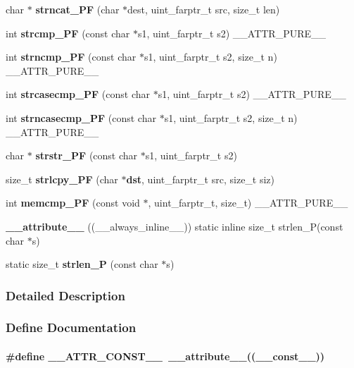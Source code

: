 \begin{DoxyCompactItemize}
\item 
char $\ast$ {\bf strncat\_\-PF} (char $\ast$dest, uint\_\-farptr\_\-t src, size\_\-t len)
\item 
int {\bf strcmp\_\-PF} (const char $\ast$s1, uint\_\-farptr\_\-t s2) \_\-\_\-ATTR\_\-PURE\_\-\_\-
\item 
int {\bf strncmp\_\-PF} (const char $\ast$s1, uint\_\-farptr\_\-t s2, size\_\-t n) \_\-\_\-ATTR\_\-PURE\_\-\_\-
\item 
int {\bf strcasecmp\_\-PF} (const char $\ast$s1, uint\_\-farptr\_\-t s2) \_\-\_\-ATTR\_\-PURE\_\-\_\-
\item 
int {\bf strncasecmp\_\-PF} (const char $\ast$s1, uint\_\-farptr\_\-t s2, size\_\-t n) \_\-\_\-ATTR\_\-PURE\_\-\_\-
\item 
char $\ast$ {\bf strstr\_\-PF} (const char $\ast$s1, uint\_\-farptr\_\-t s2)
\item 
size\_\-t {\bf strlcpy\_\-PF} (char $\ast${\bf dst}, uint\_\-farptr\_\-t src, size\_\-t siz)
\item 
int {\bf memcmp\_\-PF} (const void $\ast$, uint\_\-farptr\_\-t, size\_\-t) \_\-\_\-ATTR\_\-PURE\_\-\_\-
\item 
{\bf \_\-\_\-attribute\_\-\_\-} ((\_\-\_\-always\_\-inline\_\-\_\-)) static inline size\_\-t strlen\_\-P(const char $\ast$s)
\item 
static size\_\-t {\bf strlen\_\-P} (const char $\ast$s)
\end{DoxyCompactItemize}


\subsubsection{Detailed Description}


\subsubsection{Define Documentation}
\paragraph[{\_\-\_\-ATTR\_\-CONST\_\-\_\-}]{\setlength{\rightskip}{0pt plus 5cm}\#define \_\-\_\-ATTR\_\-CONST\_\-\_\-~\_\-\_\-attribute\_\-\_\-((\_\-\_\-const\_\-\_\-))}\hfill\label{pgmspace_8h_a87f6b1b3880d945610873b9da382e5d4}
